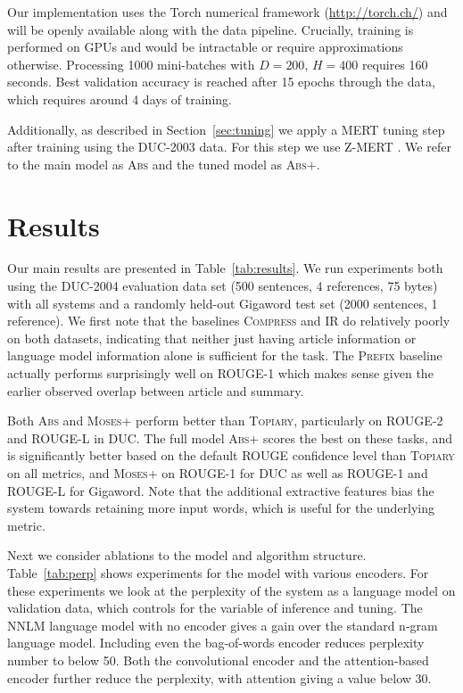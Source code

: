 \documentclass[11pt,a4paper]{article}
\begin{document}
Our implementation uses the Torch numerical framework
(\url{http://torch.ch/}) and will be openly available along with the
data pipeline. Crucially, training is performed on GPUs and would be
intractable or require approximations otherwise. Processing 1000
mini-batches with $D=200$, $H=400$ requires 160 seconds.  Best
validation accuracy is reached after 15 epochs through the data, which
requires around 4 days of training.

Additionally, as described in Section~\ref{sec:tuning} we apply a
MERT tuning step after training using the DUC-2003 data.  For this step we use Z-MERT
\cite{zaidan2009z}. We refer to the
main model as \textsc{Abs} and the tuned model as
\textsc{Abs+}.
 


\section{Results}
\label{sec:results}

Our main results are presented in Table~\ref{tab:results}. We run
experiments both using the DUC-2004 evaluation data set (500
sentences, 4 references, 75 bytes) with all systems and a randomly
held-out Gigaword test set (2000 sentences, 1 reference). We first
note that the baselines \textsc{Compress} and \textsc{IR} do
relatively poorly on both datasets, indicating that neither just
having article information or language model information alone is
sufficient for the task. The \textsc{Prefix} baseline actually
performs surprisingly well on ROUGE-1 which makes sense given the
earlier observed overlap between article and summary. 


Both \textsc{Abs} and \textsc{Moses+} perform better than
\textsc{Topiary}, particularly on ROUGE-2 and ROUGE-L in DUC.  The
full model \textsc{Abs+} scores the best on these tasks, and is
significantly better based on the default ROUGE confidence level than
\textsc{Topiary} on all metrics, and \textsc{Moses+} on
ROUGE-1 for DUC as well as ROUGE-1 and ROUGE-L for Gigaword. Note that the additional extractive features bias the
system towards retaining more input words, which is useful for the
underlying metric.

Next we consider ablations to the model and algorithm
structure. Table~\ref{tab:perp} shows experiments for the model with
various encoders. For these experiments we look at the perplexity of
the system as a language model on validation data, which controls for
the variable of inference and tuning.  The NNLM language model with no
encoder gives a gain over the standard n-gram language
model. Including even the bag-of-words encoder reduces perplexity
number to below 50. Both the convolutional encoder and the
attention-based encoder further reduce the perplexity, with
attention giving a value below 30.
\end{document}
